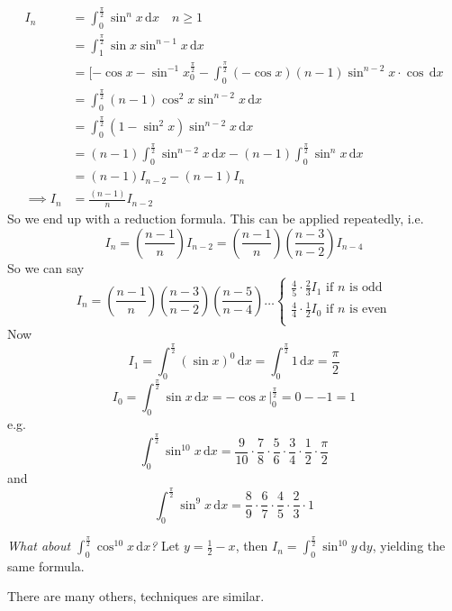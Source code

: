 \documentclass[10pt]{scrartcl}
\begin{document}
\begin{example}
\[
\begin{aligned}
  I_n &= \int_0^{\frac{\pi}{2}} \sin^nx\,\mathrm{d}x \quad n \geq 1 \\
  &= \int_1^{\frac{\pi}{2}} \sin x \sin^{n-1}x\,\mathrm{d}x\\
  &= [-\cos x - \sin^{-1}x_0^{\frac{\pi}{2}} - \int_0^{\frac{\pi}{2}} (-\cos x)(n-1)\sin^{n-2}x\cdot \cos\,\mathrm{d}x\\
  &= \int_0^{\frac{\pi}{2}}(n-1)\cos^2x\sin^{n-2}x\,\mathrm{d}x\\
  &= \int_0^{\frac{\pi}{2}}(1-\sin^2x)\sin^{n-2}x\,\mathrm{d}x\\
  &= (n-1)\int_0^{\frac{\pi}{2}} \sin^{n-2}x\,\mathrm{d}x - (n-1)\int_0^{\frac{\pi}{2}}\sin^nx\,\mathrm{d}x\\
  &= (n-1)I_{n-2} - (n-1)I_n\\[.2cm]
\implies I_n  &= \frac{(n-1)}{n}I_{n-2}
\end{aligned}
\]
So we end up with a reduction formula. This can be applied repeatedly, i.e. 
\[
  I_n = \left(\frac{n-1}{n}\right)I_{n-2} = \left(\frac{n-1}{n}\right)\left(\frac{n-3}{n-2}\right)I_{n-4}
\]
So we can say 
\[
  I_n =\left(\frac{n-1}{n}\right) \left(\frac{n-3}{n-2}\right)\left(\frac{n-5}{n-4}\right)\dots \begin{cases}
 \frac{4}{5}\cdot \frac{2}{3} I_1 \mbox{ if $n$ is odd}\\	
  \frac{4}{4}\cdot \frac{1}{2} I_0 \mbox{ if $n$ is even}\\	
 \end{cases}
\]
Now 
\[
  I_1 = \int_0^{\frac{\pi}{2}} (\sin x)^0 \,\mathrm{d}x = \int_0^{\frac{\pi}{2}} 1\,\mathrm{d}x = \frac{\pi}{2}
\]
\[
  I_0= \int_0^{\frac{\pi}{2}} \sin x\,\mathrm{d}x = \left.-\cos x\,\right|^{\frac{\pi}{2}}_0 = 0--1 = 1
\]
e.g.
\[
  \int_0^{\frac{\pi}{2}} \sin^{10}x\,\mathrm{d}x = \frac{9}{10}\cdot\frac{7}{8}\cdot \frac{5}{6}\cdot\frac{3}{4}\cdot\frac{1}{2}\cdot\frac{\pi}{2}
\]
and 
\[
  \int_0^{\frac{\pi}{2}} \sin^9x\,\mathrm{d}x = \frac{8}{9}\cdot\frac{6}{7} \cdot \frac{4}{5} \cdot \frac{2}{3} \cdot 1
\]
\end{example}\vsp


\emph{What about $\int_0^{\frac{\pi}{2}} \cos^{10}x\,\mathrm{d}x$?} Let $y=  \frac{1}{2} -x$, then $I_n = \int_0^{\frac{\pi}{2}} \sin^{10}y\,\mathrm{d}y$, yielding the same formula. 

There are many others, techniques are similar.\\
\end{document}
